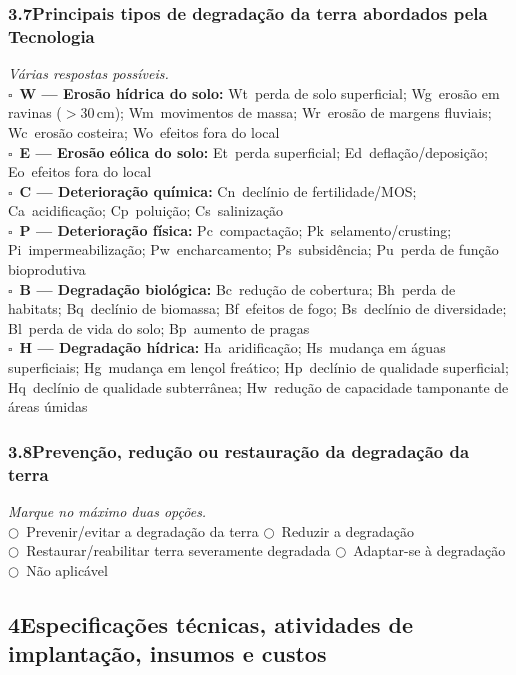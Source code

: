 \subsubsection*{3.7\quad Principais tipos de degradação da terra abordados pela Tecnologia}
\textit{Várias respostas possíveis.}\\[4pt]
$\square$~\textbf{W --- Erosão hídrica do solo:} Wt~perda de solo superficial; Wg~erosão em ravinas ($>$30\,cm); Wm~movimentos de massa; Wr~erosão de margens fluviais; Wc~erosão costeira; Wo~efeitos fora do local\\
$\square$~\textbf{E --- Erosão eólica do solo:} Et~perda superficial; Ed~deflação/deposição; Eo~efeitos fora do local\\
$\square$~\textbf{C --- Deterioração química:} Cn~declínio de fertilidade/MOS; Ca~acidificação; Cp~poluição; Cs~salinização\\
$\square$~\textbf{P --- Deterioração física:} Pc~compactação; Pk~selamento/crusting; Pi~impermeabilização; Pw~encharcamento; Ps~subsidência; Pu~perda de função bioprodutiva\\
$\square$~\textbf{B --- Degradação biológica:} Bc~redução de cobertura; Bh~perda de habitats; Bq~declínio de biomassa; Bf~efeitos de fogo; Bs~declínio de diversidade; Bl~perda de vida do solo; Bp~aumento de pragas\\
$\square$~\textbf{H --- Degradação hídrica:} Ha~aridificação; Hs~mudança em águas superficiais; Hg~mudança em lençol freático; Hp~declínio de qualidade superficial; Hq~declínio de qualidade subterrânea; Hw~redução de capacidade tamponante de áreas úmidas

\subsubsection*{3.8\quad Prevenção, redução ou restauração da degradação da terra}
\textit{Marque no máximo duas opções.}\\[4pt]
$\bigcirc$~Prevenir/evitar a degradação da terra \quad $\bigcirc$~Reduzir a degradação\\
$\bigcirc$~Restaurar/reabilitar terra severamente degradada \quad $\bigcirc$~Adaptar-se à degradação\\
$\bigcirc$~Não aplicável

\subsection*{4\quad Especificações técnicas, atividades de implantação, insumos e custos}


